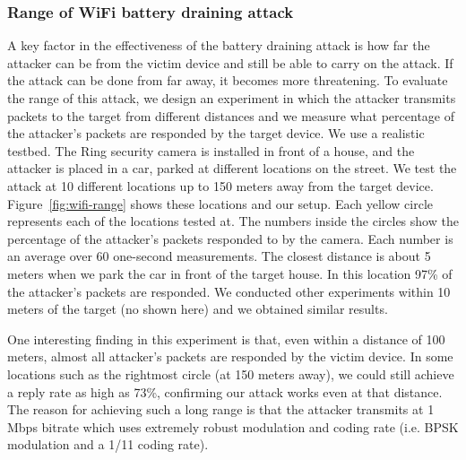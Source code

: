 \subsubsection{Range of WiFi battery draining attack}
A key factor in the effectiveness of the battery draining attack is how far the 
attacker can be from the victim device and still be able to carry on the attack. 
If the attack can be done from far away, it becomes more threatening. 
To evaluate the range of this attack, we design an experiment in which the attacker transmits packets to the target from different distances and we measure what percentage of the attacker's packets are responded by the target device.
We use a realistic testbed. The Ring security camera is installed in front of a house, and the attacker is placed in a car, parked at different locations on the street. We test the attack at 10 different locations up to 150 meters away from the target device. Figure~\ref{fig:wifi-range} 
shows these locations and our setup. Each yellow circle represents each of the locations tested at. The numbers inside the circles show the percentage of the attacker's packets responded to by the camera.
Each number is an average over 60 one-second measurements.
The closest distance is about 5 meters when we park the car in front of the target house. 
In this location 97\% of the attacker's packets are responded.
We conducted other experiments within 10 meters of the target (no shown here) and we obtained similar results.

One interesting finding in this experiment is that, even within a distance of 100 meters, almost all attacker's packets are responded by the victim device. In some locations such as the rightmost circle (at 150 meters away), we could still achieve a reply rate as high as 73\%, confirming our attack works even at that distance. The reason for achieving such a long range is that the attacker transmits at 1 Mbps bitrate which uses extremely robust modulation and coding rate (i.e. BPSK modulation and a 1/11 coding rate). 

